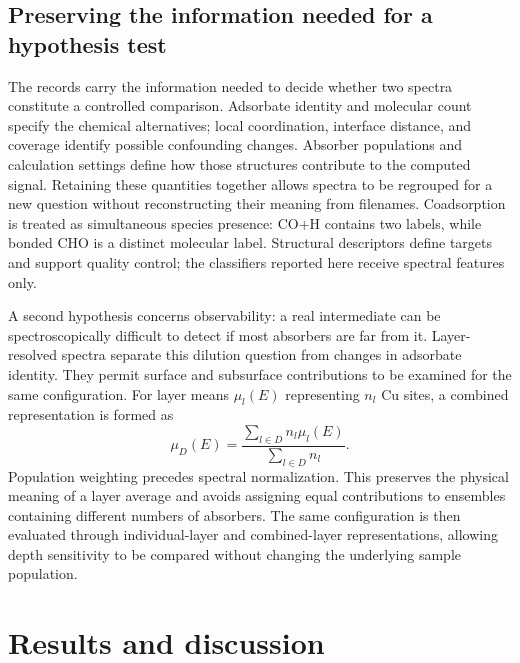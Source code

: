 \documentclass[11pt,a4paper]{article}
\begin{document}
\subsection{Preserving the information needed for a hypothesis test}
The records carry the information needed to decide whether two spectra constitute a controlled comparison. Adsorbate identity and molecular count specify the chemical alternatives; local coordination, interface distance, and coverage identify possible confounding changes. Absorber populations and calculation settings define how those structures contribute to the computed signal. Retaining these quantities together allows spectra to be regrouped for a new question without reconstructing their meaning from filenames. Coadsorption is treated as simultaneous species presence: CO+H contains two labels, while bonded CHO is a distinct molecular label. Structural descriptors define targets and support quality control; the classifiers reported here receive spectral features only.

A second hypothesis concerns observability: a real intermediate can be spectroscopically difficult to detect if most absorbers are far from it. Layer-resolved spectra separate this dilution question from changes in adsorbate identity. They permit surface and subsurface contributions to be examined for the same configuration. For layer means $\mu_l(E)$ representing $n_l$ Cu sites, a combined representation is formed as
\begin{equation}
\mu_D(E)=\frac{\sum_{l\in D}n_l\mu_l(E)}{\sum_{l\in D}n_l}.
\label{eq:average}
\end{equation}
Population weighting precedes spectral normalization. This preserves the physical meaning of a layer average and avoids assigning equal contributions to ensembles containing different numbers of absorbers. The same configuration is then evaluated through individual-layer and combined-layer representations, allowing depth sensitivity to be compared without changing the underlying sample population.

\section{Results and discussion}
\end{document}
